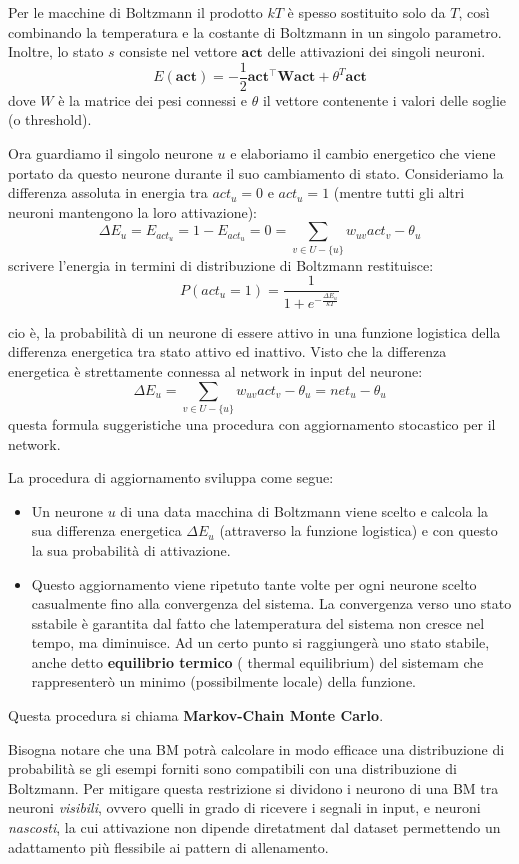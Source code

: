 \documentclass{article}
\begin{document}
Per le macchine di Boltzmann il prodotto $kT$ è spesso sostituito solo da $T$, così combinando
la temperatura e la costante di Boltzmann in un singolo parametro. Inoltre, lo stato $s$ consiste
nel vettore $\textbf{act}$ delle attivazioni dei singoli neuroni.
$$E(\textbf{act})=-\frac{1}{2}\textbf{act}^\intercal \textbf{W} \textbf{act}+\theta^T \textbf{act}$$
dove $W$ è la matrice dei pesi connessi e $\theta$ il vettore contenente i valori delle soglie (o threshold).

Ora guardiamo il singolo neurone $u$ e elaboriamo il cambio energetico che viene portato da
questo neurone durante il suo cambiamento di stato. Consideriamo la differenza assoluta in energia
tra $act_u=0$ e $act_u=1$ (mentre tutti gli altri neuroni mantengono la loro attivazione):
$$\Delta E_u=E_{act_u}=1-E_{act_u}=0=\sum_{v\in U-\{u\}}w_{uv}act_v-\theta_u$$
scrivere l'energia in termini di distribuzione di Boltzmann restituisce:
$$P(act_u=1)=\frac{1}{1+e^{-\frac{\Delta E_u}{kT}}}$$

cio è, la probabilità di un neurone di essere attivo in una funzione logistica della differenza
energetica tra stato attivo ed inattivo. Visto che la differenza energetica è strettamente connessa
al network in input del neurone:
$$\Delta E_u=\sum_{v\in U-\{u\}}w_{uv}act_v-\theta_u=net_u-\theta_u$$
questa formula suggeristiche una procedura con aggiornamento stocastico per il network.

La procedura di aggiornamento sviluppa come segue:
\begin{itemize}
    \item Un neurone $u$ di una data macchina di Boltzmann viene scelto e calcola
          la sua differenza energetica $\Delta E_u$ (attraverso la funzione logistica) e
          con questo la sua probabilità di attivazione.
    \item Questo aggiornamento viene ripetuto tante volte per ogni neurone scelto
          casualmente fino alla convergenza del sistema. La convergenza verso uno stato sstabile
          è garantita dal fatto che latemperatura del sistema non cresce nel tempo, ma diminuisce.
          Ad un certo punto si raggiungerà uno stato stabile, anche detto \textbf{equilibrio termico} (
          thermal equilibrium) del sistemam che rappresenterò un minimo (possibilmente locale)
          della funzione.
\end{itemize}
Questa procedura si chiama \textbf{Markov-Chain Monte Carlo}.

Bisogna notare che una BM potrà calcolare in modo efficace una distribuzione di probabilità se
gli esempi forniti sono compatibili con una distribuzione di Boltzmann. Per mitigare questa
restrizione si dividono i neurono di una BM tra neuroni \textit{visibili}, ovvero quelli
in grado di ricevere i segnali in input, e neuroni \textit{nascosti}, la cui attivazione
non dipende diretatment dal dataset permettendo un adattamento più flessibile ai pattern
di allenamento.
\end{document}

